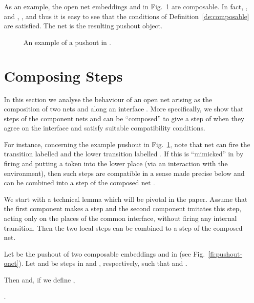 \documentclass{LMCS}
\begin{document}
As an example, the open net embeddings  and  in
Fig.~\ref{fi:pushout} are composable. In fact, ,
 and , , and thus it is easy to see that the conditions of
Definition~\ref{de:composable} are satisfied. The net  is the
resulting pushout object.

\begin{figure}[t]
  \begin{center}
  \end{center}

  \caption{An example of a pushout in .}
  \label{fi:pushout}
\end{figure}


\section{Composing Steps}



In this section we analyse the behaviour of an open net  arising
as the composition of two nets  and  along an interface
.  More specifically,
we show that steps of the component
nets  and  can be ``composed'' to give a step of  when
they agree on the interface and satisfy suitable compatibility
conditions.

For instance, concerning the example pushout in Fig.~\ref{fi:pushout},
note that net  can fire the transition labelled  and the lower
transition labelled . If this is ``mimicked'' in  by firing
 and putting a token into the lower place  (via an interaction
 with the environment), then such steps are compatible in a
sense made precise below and can be combined into a step of the
composed net .

We start with a technical lemma which will be pivotal in the paper.
Assume that the first component makes a step and the second component
imitates this step, acting only on the places of the common interface,
without firing any internal transition. Then the two local steps can
be combined to a step of the composed net.

\begin{lem}
  \label{le:downup}
  Let  be the pushout of two composable
  embeddings  and  in  
  (see Fig.~\ref{fi:pushout-onet}).
Let  and  be steps in
   and , respectively, such that  and .

  Then  and, if we define ,

  \begin{center}
    .
  \end{center}
\end{lem}
\end{document}
